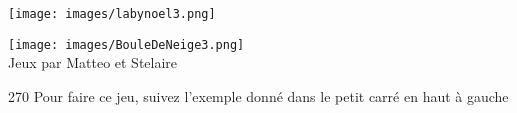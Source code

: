 \newpage
\begin{center}
\vspace*{-1cm}
\end{center}
\vspace*{-1.1cm}
\vspace*{-1.8cm}\texttt{[image: images/labynoel3.png]}

\vspace*{-1.7cm}
\begin{center}
\vspace*{-.8cm}\begin{minipage}{.9\textwidth}
\texttt{[image: images/BouleDeNeige3.png]}\\
Jeux par Matteo et Stelaire
\end{minipage}\hspace*{1mm}\begin{minipage}{.06\textwidth}
\begin{rotate}{270}
\hspace*{-5.6cm}Pour faire ce jeu, suivez l'exemple donné dans le petit carré en haut à gauche
\end{rotate}
\end{minipage}
\end{center}
